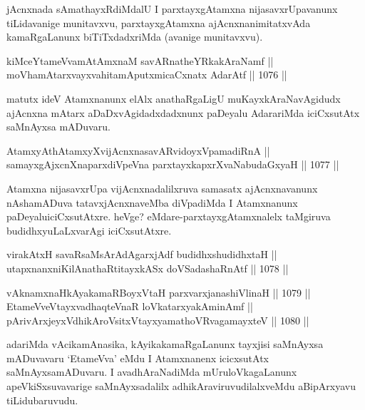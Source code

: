 \begin{artha}
jAcnxnada sAmathayxRdiMdalU I parxtayxgAtamxna nijasavxrUpavanunx tiLidavanige munitavxvu, parxtayxgAtamxna ajAcnxnanimitatxvAda kamaRgaLanunx biTiTxdadxriMda (avanige munitavxvu).
\end{artha}


\begin{shl}
kiMceYtameVvamAtAmxnaM savARnatheYRkakAraNamf || \\
moVhamAtarxvayxvahitamAputxmicaCxnatx AdarAtf \hfill || 1076 ||  
\end{shl}

\begin{artha}
matutx ideV Atamxnanunx elAlx anathaRgaLigU muKayxkAraNavAgidudx ajAcnxna mAtarx aDaDxvAgidadxdadxnunx paDeyalu AdarariMda iciCxsutAtx saMnAyxsa mADuvaru.
\end{artha}


\begin{shl}
AtamxyAthAtamxyXvijAcnxnasavARvidoyxVpamadiRnA || \\
samayxgAjxcnXnaparxdiVpeVna parxtayxkapxrXvaNabudaGxyaH \hfill || 1077 ||  
\end{shl}

\begin{artha}
Atamxna nijasavxrUpa vijAcnxnadalilxruva samasatx ajAcnxnavanunx nAshamADuva tatavxjAcnxnaveMba diVpadiMda I Atamxnanunx paDeyalu\break iciCxsutAtxre. heVge? eMdare-parxtayxgAtamxnalelx taMgiruva budidhxyuLaLxvarAgi iciCxsutAtxre.
\end{artha}

\begin{shl}
virakAtxH savaRsaMsArAdAgarxjAdf budidhxshudidhxtaH || \\
utapxnanxniKilAnathaRtitayxkASx doVSadashaRnAtf \hfill || 1078 ||  
\end{shl}
				
\begin{shl}
vAknamxnaHkAyakamaRBoyxV\s taH parxvarxjanashiVlinaH \hfill || 1079 ||  \\
EtameVveVtayxvadhaqteVnaR loVkatarxyakAminAmf || \\
pArivArxjeyxV\s dhikAroV\s sitxVtayxyamathoVR\s vagamayxteV \hfill || 1080 ||  
\end{shl}

\begin{artha}
adariMda vAcikamAnasika, kAyikakamaRgaLanunx tayxjisi saMnAyxsa mADuvavaru `EtameVva' eMdu I Atamxnanenx icicxsutAtx saMnAyxsamADuvaru. I avadhAraNadiMda mUruloVkagaLanunx apeVkiSxsuvavarige saMnAyxsadalilx adhikAraviruvudilalxveMdu aBipArxyavu tiLidubaruvudu.
\end{artha}

